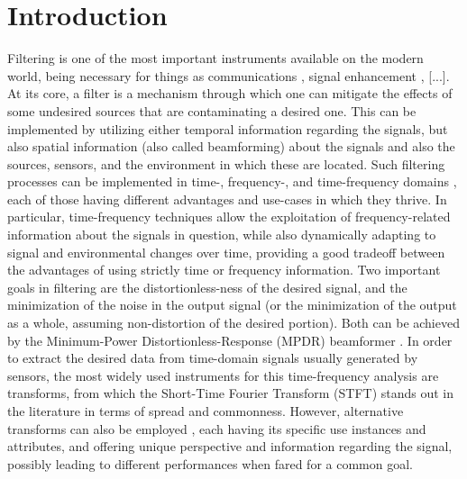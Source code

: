 \section{Introduction}
\label{sec:introduction}

Filtering is one of the most important instruments available on the modern world, being necessary for things as communications \cite{chen_source_2002}, signal enhancement \cite{lobato_worst-case-optimization_2020,lu_biomedical_1994,nguyen_minimum_2017}, [...]. At its core, a filter is a mechanism through which one can mitigate the effects of some undesired sources that are contaminating a desired one. This can be implemented by utilizing either temporal information regarding the signals, but also spatial information (also called beamforming) about the signals and also the sources, sensors, and the environment in which these are located. Such filtering processes can be implemented in time-, frequency-, and time-frequency domains \cite{benesty_fundamentals_2017}, each of those having different advantages and use-cases in which they thrive. In particular, time-frequency techniques allow the exploitation of frequency-related information about the signals in question, while also dynamically adapting to signal and environmental changes over time, providing a good tradeoff between the advantages of using strictly time or frequency information. Two important goals in filtering are the distortionless-ness of the desired signal, and the minimization of the noise in the output signal (or the minimization of the output as a whole, assuming non-distortion of the desired portion). Both can be achieved by the Minimum-Power Distortionless-Response (MPDR) beamformer \cite{capon_high-resolution_1969,erdogan_improved_2016}. In order to extract the desired data from time-domain signals usually generated by sensors, the most widely used instruments for this time-frequency analysis are transforms, from which the Short-Time Fourier Transform (STFT) \cite{kiymik_comparison_2005,pan_microphone_2021} stands out in the literature in terms of spread and commonness. However, alternative transforms can also be employed \cite{chen_wavelet-based_2018,yang_general_2014,almeida_fractional_1994}, each having its specific use instances and attributes, and offering unique perspective and information regarding the signal, possibly leading to different performances when fared for a common goal.

